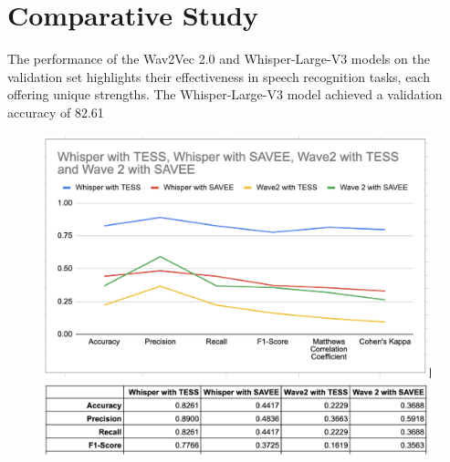 \documentclass[a4paper,12pt]{article}
\begin{document}
\section{Comparative Study}
The performance of the Wav2Vec 2.0 and Whisper-Large-V3 models on the validation set highlights their effectiveness in speech recognition tasks, each offering unique strengths. The Whisper-Large-V3 model achieved a validation accuracy of 82.61%
\begin{figure}[H]
    \centering
    \includegraphics[width=1\linewidth]{611.png}
    \includegraphics[width=1\linewidth]{612.png}
\end{figure}
\end{document}
